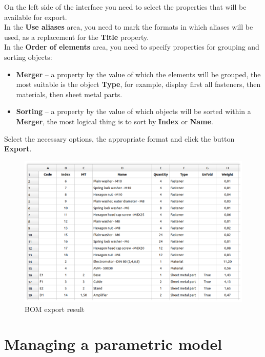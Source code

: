 \documentclass[a4paper,12pt]{article}
\begin{document}
On the left side of the interface you need to select the properties that will be available for export.\\

In the \textbf{Use aliases} area, you need to mark the formats in which aliases will be used, as a replacement for the \textbf{Title} property.\\

In the \textbf{Order of elements} area, you need to specify properties for grouping and sorting objects:
\begin{itemize}
	\item \textbf{Merger} -- a property by the value of which the elements will be grouped, the most suitable is the object \textbf{Type}, for example, display first all fasteners, then materials, then sheet metal parts.
	\item \textbf{Sorting} -- a property by the value of which objects will be sorted within a \textbf{Merger}, the most logical thing is to sort by \textbf{Index} or \textbf{Name}.
\end{itemize}

\pagebreak

Select the necessary options, the appropriate format and click the button \textbf{Export}.

\begin{figure}[htp]
	\centering
	\includegraphics[width=1\textwidth]{img/bom_result.png}
	\caption{BOM export result}
	\label{sec:bom_result}
\end{figure}

\pagebreak




\section{Managing a parametric model}
\end{document}
